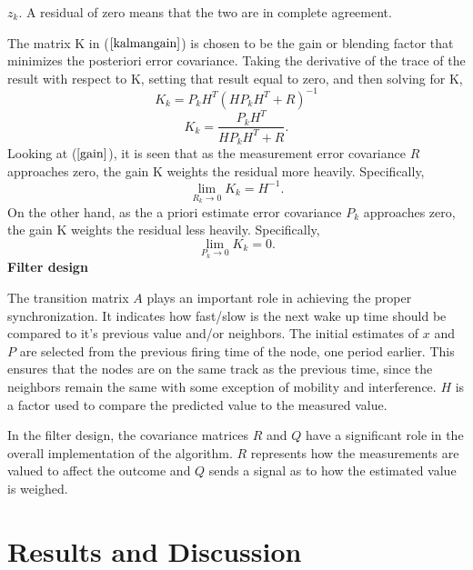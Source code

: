\documentclass[journal]{IEEEtran}
\begin{document}
$z_k$. A residual of zero means that the two are in complete
agreement. \par
The matrix K in ($\ref{kalmangain}$) is
chosen to be the gain or blending factor that minimizes the
posteriori error covariance. Taking the derivative of the trace of
the result with respect to K, setting that result equal to zero, and
then solving for K,
\begin{equation}
K_k = P_kH^{T}(HP_kH^{T} + R)^{-1}
\end{equation}
\begin{equation}
K_k = \frac{P_kH^T}{HP_kH^T + R}. \label{gain}
\end{equation}
Looking at ($\ref{gain}$), it is seen that as the measurement error
covariance $R$ approaches zero, the gain K weights the residual more
heavily. Specifically,
\begin{equation}
\mathop {\lim }\limits_{R_k \to 0 } {K_k} = H^{-1}.
\end{equation}
On the other hand, as the a priori estimate error covariance $P_k$
approaches zero, the gain K weights the residual less heavily.
Specifically,
\begin{equation}
\mathop {\lim }\limits_{P_k \to 0 } {K_k} = 0.
\end{equation}
\textbf{Filter design} \par
The transition matrix $A$ plays an important role in achieving
the proper synchronization. It indicates how fast/slow is the next wake up time should be compared
to it's previous value and/or neighbors. The initial estimates of $x$ and $P$ are selected from the
previous firing time of the node, one period earlier. This ensures that the nodes are on the same track as the previous time, since the neighbors remain the same with some exception of mobility and interference. $H$ is a factor used to compare the predicted value to the measured value. \par
In the filter design, the covariance matrices $R$ and $Q$ have a significant
role in the overall implementation of the algorithm. $R$ represents how
 the measurements are valued to affect the outcome and $Q$
sends a signal as to how the estimated value is weighed.
\section{\textbf{Results and Discussion}}
\end{document}
